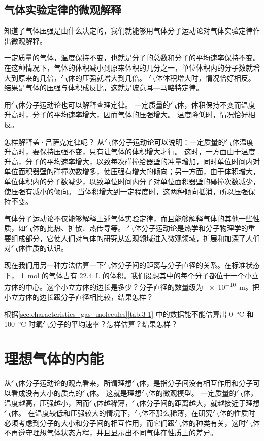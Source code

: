 \subsection{气体实验定律的微观解释} 
知道了气体压强是由什么决定的，我们就能够用气体分子运动论对气体实验定律作出微观解释。

一定质量的气体，温度保持不变，也就是分子的总数和分子的平均速率保持不变。
在这种情况下，气体的体积减小到原来体积的几分之一，单位体积内的分子数就增大到原来的几倍，气体的压强就增大到几倍。
气体体积增大时，情况恰好相反。
结果是气体的压强与体积成反比，这就是玻意耳—马略特定律。

用气体分子运动论也可以解释查理定律。
一定质量的气体，体积保持不变而温度升高时，分子的平均速率增大，因而气体的压强增大。
温度降低时，情况恰好相反。

怎样解释盖·吕萨克定律呢？
从气体分子运动论可以说明：一定质量的气体温度升高时，要保持压强不变，只有让气体的体积增大才行。
这时，一方面由于温度升高，分子的平均速率增大，以致每次碰撞给器壁的冲量增加，同时单位时间内对单位面积器壁的碰撞次数增多，使压强有增大的倾向；另一方面，由于体积增大，单位体积内的分子数减少，以致单位时间内分子对单位面积器壁的碰撞次数减少，使压强有减小的倾向。
当体积增大到一定程度时，这两种倾向抵消，所以压强保持不变。

气体分子运动论不仅能够解释上述气体实验定律，而且能够解释气体的其他一些性质，如气体的比热、扩散、热传导等。
气体分子运动论是热学和分子物理学的重要组成部分，它使人们对气体的研究从宏观领域进入微观领域，扩展和加深了人们对气体性质的认识。

\begin{Practice}
\begin{question}
	\item 现在我们用另一种方法估算一下气体分子间的距离与分子直径的关系。在标准状态下， \qty{1}{mol} 的气体占有 \qty{22.4}{L} 的体积。我们设想其中的每个分子都位于一个小立方体的中心。这个小立方体的边长是多少？分子直径的数量级为 \qty{e-10}{m}。把小立方体的边长跟分子直径相比较，结果怎样？
	\item 根据\cref{sec:characteristics_gas_molecules}\cref{tab:3-1} 中的数据能不能估算出 \qty{0}{\celsius} 和 \qty{100}{\celsius} 时氧气分子的平均速率？怎样估算？结果怎样？
\end{question}
\end{Practice}

\section{理想气体的内能}
从气体分子运动论的观点看来，所谓理想气体，是指分子间没有相互作用和分子可以看成没有大小的质点的气体。
这就是理想气体的微观模型。
一定质量的气体，温度越高，压强越小，因而气体越稀薄，气体分子间的距离越大，就越接近于理想气体。
在温度较低和压强较大的情况下，气体不那么稀薄，在研究气体的性质时必须考虑到分子的大小和分子间的相互作用，而它们跟气体的种类有关，这时气体不再遵守理想气体状态方程，并且显示出不同气体在性质上的差异。

